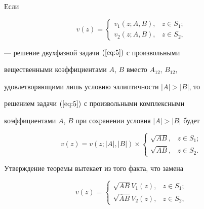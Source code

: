 \begin{thm}


Если


$$


v(z)=\begin{cases}


v_1(z;A,B), & z\in S_1;\\


v_2(z;A,B), & z\in S_2,\end{cases}


$$


--- решение двухфазной задачи $(\ref{eq:5})$ с произвольными


вещественными коэффициентами $A$, $B$ вместо $A_{12}$, $B_{12}$,


удовлетворяющими лишь условию эллиптичности $|A|>|B|$, то


решением задачи $(\ref{eq:5})$ с произвольными комплексными


коэффициентами $A$, $B$ при сохранении условия $|A|>|B|$ будет


\begin{equation} %


v(z)= v\left(z;|A|,|B|\right)\times


\begin{cases}


\sqrt{AB},& z\in S_1;\\


\sqrt{\overline AB}, & z\in S_2.


\end{cases}


\label{eq:10}


\end{equation}


\end{thm}





Утверждение теоремы вытекает из того факта, что замена


\begin{equation} %


v(z)=\begin{cases}


\sqrt{AB}V_1(z), & z\in S_1;\\


\sqrt{\overline AB}V_2(z), & z\in S_2,


\end{cases}\label{eq:11}


\end{equation}


